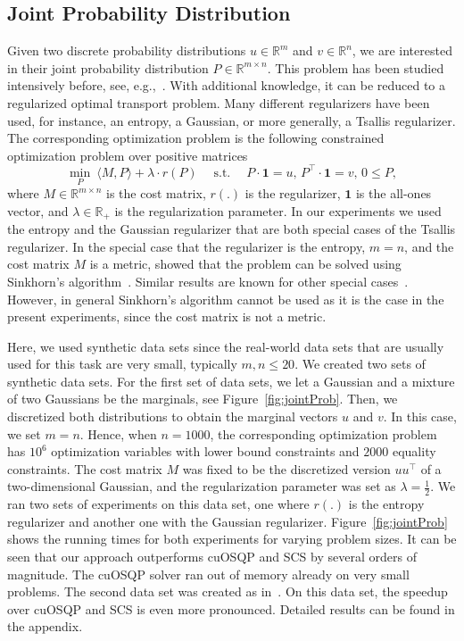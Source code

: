 \documentclass[letterpaper]{article} %
\DeclareMathOperator{\st}{s.t.}
\newcommand{\setR}{\mathbb{R}}
\newcommand{\vecOne}{\bm{1}}
\newcommand{\sprod}[2]{\langle{#1}, {#2}\rangle}
\begin{document}
\subsection{Joint Probability Distribution}
Given two discrete probability distributions $u\in\setR^m$ and $v\in\setR^n$, we are interested in their joint probability distribution $P\in\setR^{m\times n}$. %
This problem has been studied intensively before, see, e.g.,~\cite{Cuturi13, FrognerP19, MuzellecNPN17}. With additional knowledge, it can be reduced to a regularized optimal transport problem. Many different regularizers have been used, for instance, an entropy, a Gaussian, or more generally, a Tsallis regularizer. The corresponding optimization problem is the following constrained optimization problem over positive matrices
\[
\min_{P}\: \sprod{M}{P} + \lambda \cdot r(P) \quad \st\quad P\cdot \vecOne = u,\, P^\top \cdot \vecOne = v,\, 0\leq P,
\]
where $M\in\setR^{m\times n}$ is the cost matrix, $r(.)$ is the regularizer, $\vecOne$ is the all-ones vector, and $\lambda\in\setR_+$ is the regularization parameter.
In our experiments we used the entropy and the Gaussian regularizer that are both special cases of the Tsallis regularizer. In the special case that the regularizer is the entropy, $m=n$, and the cost matrix $M$ is a metric, \cite{Cuturi13} showed that the problem can be solved using Sinkhorn's algorithm~\cite{Sinkhorn67}. Similar results are known for other special cases~\cite{JanatiMPC20}. However, in general  Sinkhorn's algorithm cannot be used as it is the case in the present experiments, since the cost matrix is not a metric.

Here, we used synthetic data sets since the real-world data sets that are usually used for this task are very small, typically $m, n \leq 20$. We created two sets of synthetic data sets. For the first set of data sets, we let a Gaussian and a mixture of two Gaussians be the marginals, see Figure~\ref{fig:jointProb}. Then, we discretized both distributions to obtain the marginal vectors $u$ and $v$. In this case, we set $m=n$. Hence, when $n=1000$, the corresponding optimization problem has $10^6$ optimization variables with lower bound constraints and $2000$ equality constraints. The cost matrix $M$ was fixed to be the discretized version $uu^\top$ of a two-dimensional Gaussian, and the regularization parameter was set as $\lambda=\frac{1}{2}$. We ran two sets of experiments on this data set, one where $r(.)$ is the entropy regularizer and another one with the Gaussian regularizer. Figure~\ref{fig:jointProb} shows the running times for both experiments for varying problem sizes. It can be seen that our approach outperforms cuOSQP and SCS by several orders of magnitude. The cuOSQP solver ran out of memory already on very small problems. The second data set was created as in~\cite{FrognerP19}. On this data set, the speedup over cuOSQP and SCS is even more pronounced. Detailed results can be found in the appendix.
\end{document}
